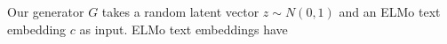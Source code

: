 Our generator $G$ takes a random latent vector $z \sim N(0, 1)$ and an ELMo text embedding $c$ as input. ELMo text embeddings have 